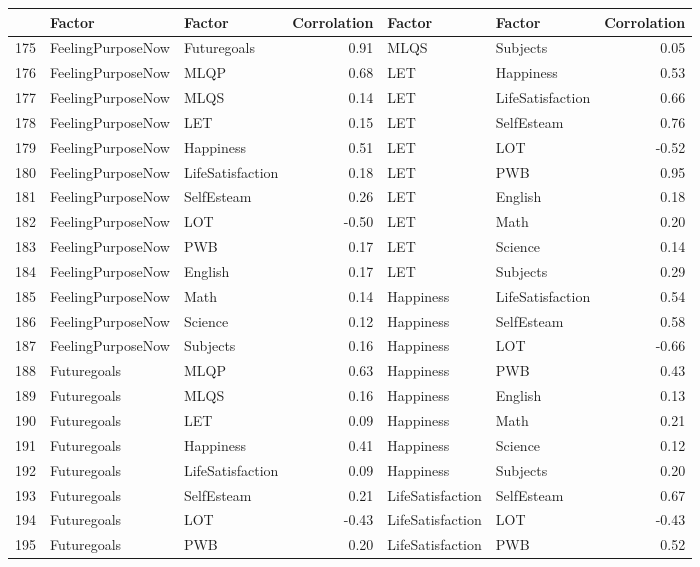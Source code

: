\documentclass{article}\usepackage[]{graphicx}\usepackage[]{color}
\begin{document}
\begin{table}[ht]
\centering
\begin{tabular}{rllrllr}
  \hline
 & Factor & Factor & Corrolation & Factor & Factor & Corrolation \\ 
  \hline
175 & FeelingPurposeNow & Futuregoals & 0.91 & MLQS & Subjects & 0.05 \\ 
  176 & FeelingPurposeNow & MLQP & 0.68 & LET & Happiness & 0.53 \\ 
  177 & FeelingPurposeNow & MLQS & 0.14 & LET & LifeSatisfaction & 0.66 \\ 
  178 & FeelingPurposeNow & LET & 0.15 & LET & SelfEsteam & 0.76 \\ 
  179 & FeelingPurposeNow & Happiness & 0.51 & LET & LOT & -0.52 \\ 
  180 & FeelingPurposeNow & LifeSatisfaction & 0.18 & LET & PWB & 0.95 \\ 
  181 & FeelingPurposeNow & SelfEsteam & 0.26 & LET & English & 0.18 \\ 
  182 & FeelingPurposeNow & LOT & -0.50 & LET & Math & 0.20 \\ 
  183 & FeelingPurposeNow & PWB & 0.17 & LET & Science & 0.14 \\ 
  184 & FeelingPurposeNow & English & 0.17 & LET & Subjects & 0.29 \\ 
  185 & FeelingPurposeNow & Math & 0.14 & Happiness & LifeSatisfaction & 0.54 \\ 
  186 & FeelingPurposeNow & Science & 0.12 & Happiness & SelfEsteam & 0.58 \\ 
  187 & FeelingPurposeNow & Subjects & 0.16 & Happiness & LOT & -0.66 \\ 
  188 & Futuregoals & MLQP & 0.63 & Happiness & PWB & 0.43 \\ 
  189 & Futuregoals & MLQS & 0.16 & Happiness & English & 0.13 \\ 
  190 & Futuregoals & LET & 0.09 & Happiness & Math & 0.21 \\ 
  191 & Futuregoals & Happiness & 0.41 & Happiness & Science & 0.12 \\ 
  192 & Futuregoals & LifeSatisfaction & 0.09 & Happiness & Subjects & 0.20 \\ 
  193 & Futuregoals & SelfEsteam & 0.21 & LifeSatisfaction & SelfEsteam & 0.67 \\ 
  194 & Futuregoals & LOT & -0.43 & LifeSatisfaction & LOT & -0.43 \\ 
  195 & Futuregoals & PWB & 0.20 & LifeSatisfaction & PWB & 0.52 \\ 

\end{tabular}
\end{table}
\end{document}
